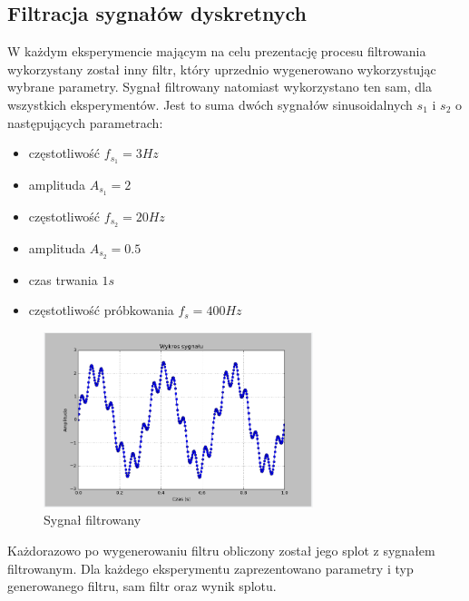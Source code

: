 \documentclass{article}
\begin{document}
    \subsection{Filtracja sygnałów dyskretnych} \label{metody:filtracja}{
            W każdym eksperymencie mającym na celu prezentację procesu filtrowania wykorzystany
            został inny filtr, który uprzednio wygenerowano wykorzystując wybrane parametry. Sygnał
            filtrowany natomiast wykorzystano ten sam, dla wszystkich eksperymentów. Jest to
            suma dwóch sygnałów sinusoidalnych $s_1$ i $s_2$ o następujących parametrach:
            \begin{itemize}
                \item częstotliwość $f_{s_1} = 3Hz$
                \item amplituda $A_{s_1} = 2$
                \item częstotliwość $f_{s_2} = 20Hz$
                \item amplituda $A_{s_2} = 0.5$
                \item czas trwania $1s$
                \item częstotliwość próbkowania $f_s = 400Hz$
            \end{itemize}
            \begin{figure}[h!]
                \centering
                \includegraphics[width=0.7\textwidth]{img/sig.png}
                \caption{Sygnał filtrowany} \label{wykres:filtrowany}
            \end{figure}
            Każdorazowo po wygenerowaniu filtru obliczony został jego splot z sygnałem
            filtrowanym. Dla każdego eksperymentu zaprezentowano parametry i typ generowanego
            filtru, sam filtr oraz wynik splotu.
        }
        
\end{document}
